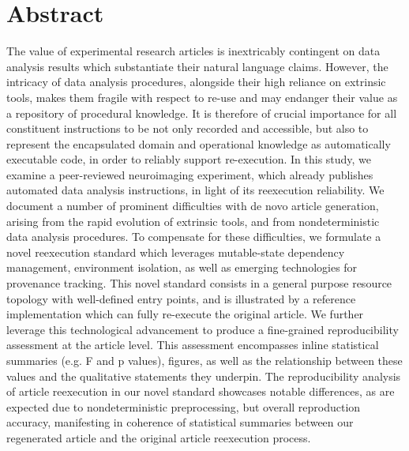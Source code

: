 \section{Abstract}

The value of experimental research articles is inextricably contingent on data analysis results which substantiate their natural language claims.
However, the intricacy of data analysis procedures, alongside their high reliance on extrinsic tools, makes them fragile with respect to re-use and may endanger their value as a repository of procedural knowledge.
It is therefore of crucial importance for all constituent instructions to be not only recorded and accessible, but also to represent the encapsulated domain and operational knowledge as automatically executable code, in order to reliably support re-execution.
In this study, we examine a peer-reviewed neuroimaging experiment, which already publishes automated data analysis instructions, in light of its reexecution reliability.
We document a number of prominent difficulties with de novo article generation, arising from the rapid evolution of extrinsic tools, and from nondeterministic data analysis procedures.
To compensate for these difficulties, we formulate a novel reexecution standard which leverages mutable-state dependency management, environment isolation, as well as emerging technologies for provenance tracking.
This novel standard consists in a general purpose resource topology with well-defined entry points, and is illustrated by a reference implementation which can fully re-execute the original article.
We further leverage this technological advancement to produce a fine-grained reproducibility assessment at the article level.
This assessment encompasses inline statistical summaries (e.g. F and p values), figures, as well as the relationship between these values and the qualitative statements they underpin.
The reproducibility analysis of article reexecution in our novel standard showcases notable differences, as are expected due to nondeterministic preprocessing, but overall reproduction accuracy, manifesting in coherence of statistical summaries between our regenerated article and the original article reexecution process.

